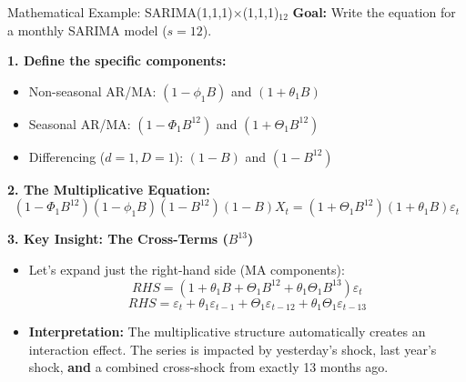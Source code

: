 \documentclass[aspectratio=169]{beamer}
\begin{document}
\begin{frame}{Mathematical Example: SARIMA(1,1,1)$\times$(1,1,1)$_{12}$}
\textbf{Goal:} Write the equation for a monthly SARIMA model ($s=12$).

\vspace{0.2cm}

\textbf{1. Define the specific components:}
\begin{itemize}
    \item Non-seasonal AR/MA: $(1 - \phi_1 B)$ and $(1 + \theta_1 B)$
    \item Seasonal AR/MA: $(1 - \Phi_1 B^{12})$ and $(1 + \Theta_1 B^{12})$
    \item Differencing ($d=1, D=1$): $(1 - B)$ and $(1 - B^{12})$
\end{itemize}

\vspace{0.2cm}

\textbf{2. The Multiplicative Equation:}
\[
(1 - \Phi_1 B^{12})(1 - \phi_1 B)(1 - B^{12})(1 - B) X_t = (1 + \Theta_1 B^{12})(1 + \theta_1 B) \varepsilon_t
\]

\vspace{0.2cm}

\textbf{3. Key Insight: The Cross-Terms ($B^{13}$)}
\begin{itemize}
    \item Let's expand just the right-hand side (MA components):
    \[ RHS = (1 + \theta_1 B + \Theta_1 B^{12} + \theta_1 \Theta_1 B^{13}) \varepsilon_t \]
    \[ RHS = \varepsilon_t + \theta_1 \varepsilon_{t-1} + \Theta_1 \varepsilon_{t-12} + \theta_1 \Theta_1 \varepsilon_{t-13} \]
    \item \textbf{Interpretation:} The multiplicative structure automatically creates an interaction effect. The series is impacted by yesterday's shock, last year's shock, \textbf{and} a combined cross-shock from exactly 13 months ago.
\end{itemize}
\end{frame}
\end{document}
